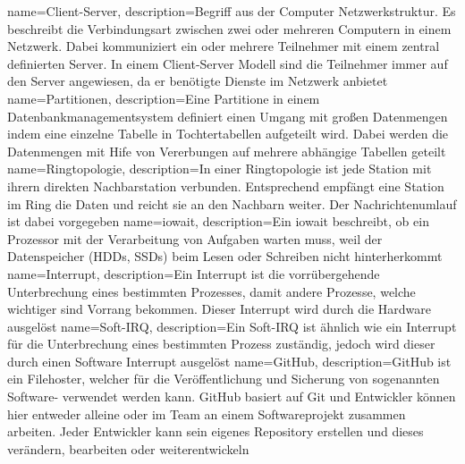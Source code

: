 {
  name=Client-Server,
  description={Begriff aus der Computer Netzwerkstruktur. Es beschreibt die
               Verbindungsart zwischen zwei oder mehreren Computern in einem
               Netzwerk. Dabei kommuniziert ein oder mehrere Teilnehmer mit
               einem zentral definierten Server. In einem Client-Server Modell
               sind die Teilnehmer immer auf den Server angewiesen, da er
               benötigte Dienste im Netzwerk anbietet}
}
{
  name=Partitionen,
  description={Eine Partitione in einem Datenbankmanagementsystem definiert
               einen Umgang mit großen Datenmengen indem eine einzelne Tabelle
               in Tochtertabellen aufgeteilt wird. Dabei werden die Datenmengen
               mit Hife von Vererbungen auf mehrere abhängige Tabellen
               geteilt}
}
{
  name=Ringtopologie,
  description={In einer Ringtopologie ist jede Station mit ihrern direkten
               Nachbarstation verbunden. Entsprechend empfängt eine Station im
               Ring die Daten und reicht sie an den Nachbarn weiter. Der
               Nachrichtenumlauf ist dabei vorgegeben}
}
{
  name=iowait,
  description={Ein iowait beschreibt, ob ein Prozessor mit der Verarbeitung von
              Aufgaben warten muss, weil der Datenspeicher (HDDs, SSDs) beim
              Lesen oder Schreiben nicht hinterherkommt}
}
{
  name=Interrupt,
  description={Ein Interrupt ist die vorrübergehende Unterbrechung eines
               bestimmten Prozesses, damit andere Prozesse, welche wichtiger
               sind Vorrang bekommen. Dieser Interrupt wird durch die Hardware
               ausgelöst}
}
{
  name=Soft-IRQ,
  description={Ein Soft-IRQ ist ähnlich wie ein \gls{Interrupt} für die
              Unterbrechung eines bestimmten Prozess zuständig, jedoch wird
              dieser durch einen Software Interrupt ausgelöst}
}
{
  name=GitHub,
  description={GitHub ist ein Filehoster, welcher für die Veröffentlichung und
               Sicherung von sogenannten
               Software- verwendet werden kann.
               GitHub basiert auf \gls{Git} und Entwickler können hier entweder
               alleine oder im Team an einem Softwareprojekt zusammen arbeiten.
               Jeder Entwickler kann sein eigenes \gls{Repository} erstellen
               und dieses verändern, bearbeiten oder weiterentwickeln}
}
